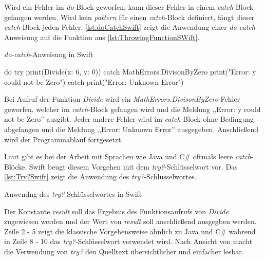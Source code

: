 Wird ein Fehler im \textit{do}-Block geworfen, kann dieser Fehler in einem \textit{catch}-Block gefangen werden. 
Wird kein \textit{pattern} für einen \textit{catch}-Block definiert, fängt dieser \textit{catch}-Block jeden Fehler. 
\autoref{lst:doCatchSwift} zeigt die Anwendung einer \textit{do-catch}-Anweisung auf die Funktion aus \autoref{lst:ThrowingFunctionSWift}.

\begin{listing}[H]
\caption{\textit{do-catch}-Anweisung in Swift}
\label{lst:doCatchSwift}
\begin{SwiftCode}
do {
    try print(Divide(x: 6, y: 0))	
} catch MathErrors.DivisonByZero {	
    print("Error: y could not be Zero")
} catch {
    print("Error: Unknown Error")
}
\end{SwiftCode}
\end{listing}

Bei Aufruf der Funktion \textit{Divide} wird ein \textit{MathErrors.DivisonByZero}-Fehler geworfen, welcher im \textit{catch}-Block gefangen wird und die Meldung ,,Error: y could not be Zero'' ausgibt. 
Jeder andere Fehler wird im \textit{catch}-Block ohne Bedingung abgefangen und die Meldung ,,Error: Unknown Error'' ausgegeben.
Anschließend wird der Programmablauf fortgesetzt.

Laut \cite[S.181]{Hoffman.2017} gibt es bei der Arbeit mit Sprachen wie Java und C\# oftmals leere \textit{catch}-Blöcke. 
Swift beugt diesem Vorgehen mit dem \textit{try?}-Schlüsselwort vor. 
Das \autoref{lst:Try?Swift} zeigt die Anwendung des \textit{try?}-Schlüsselwortes.

\begin{listing}
\caption{Anwendng des \textit{try?}-Schlüsselwortes in Swift}
\label{lst:Try?Swift}
\end{listing}

Der Konstante \textit{result} soll das Ergebnis des Funktionsaufrufs von \textit{Divide} zugewiesen werden und der Wert von \textit{result} soll anschließend ausgegben werden. 
Zeile 2 - 5 zeigt die klassische Vorgehensweise ähnlich zu Java und C\# während in Zeile 8 - 10 das \textit{try?}-Schlüsselwort verwendet wird.
Nach Ansicht von \cite[S181]{Hoffman.2017} macht die Verwendung von \textit{try?} den Quelltext übersichtlicher und einfacher lesbar.

